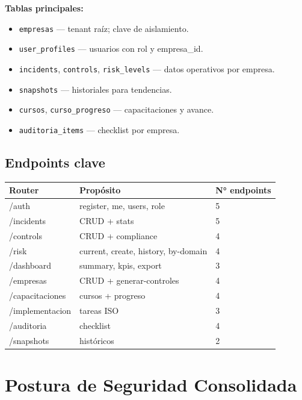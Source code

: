 \documentclass[12pt,a4paper,oneside]{article}
\begin{document}
\textbf{Tablas principales:}

\begin{itemize}[leftmargin=*]
  \item \texttt{empresas} — tenant raíz; clave de aislamiento.
  \item \texttt{user\_profiles} — usuarios con rol y empresa\_id.
  \item \texttt{incidents}, \texttt{controls}, \texttt{risk\_levels} — datos operativos por empresa.
  \item \texttt{snapshots} — historiales para tendencias.
  \item \texttt{cursos}, \texttt{curso\_progreso} — capacitaciones y avance.
  \item \texttt{auditoria\_items} — checklist por empresa.
\end{itemize}

\subsection{Endpoints clave}

\begin{table}[h]
\centering
\small
\begin{tabularx}{\textwidth}{lXl}
\toprule
\textbf{Router} & \textbf{Propósito} & \textbf{N° endpoints} \\
\midrule
/auth & register, me, users, role & 5 \\
/incidents & CRUD + stats & 5 \\
/controls & CRUD + compliance & 4 \\
/risk & current, create, history, by-domain & 4 \\
/dashboard & summary, kpis, export & 3 \\
/empresas & CRUD + generar-controles & 4 \\
/capacitaciones & cursos + progreso & 4 \\
/implementacion & tareas ISO & 3 \\
/auditoria & checklist & 4 \\
/snapshots & históricos & 2 \\
\bottomrule
\end{tabularx}
\end{table}

\section{Postura de Seguridad Consolidada}
\end{document}
